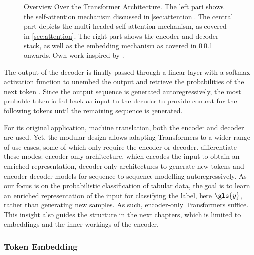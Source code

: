 \begin{landscape}
    \begin{figure}[ht]
        \centering
        {\renewcommand\normalsize{\scriptsize}%
            \normalsize
            }
        \caption[Overview Over the Transformer Architecture]{Overview Over the Transformer Architecture. The left part shows the self-attention mechanism discussed in \cref{sec:attention}. The central part depicts the multi-headed self-attention mechanism, as covered in \cref{sec:attention}. The right part shows the encoder and decoder stack, as well as the \gls{embedding} mechanism as covered in \cref{sec:token-embeddings} onwards. Own work inspired by \textcite[][3]{tayEfficientTransformersSurvey2022}.}
        \label{fig:transformer-architecture-overview}
    \end{figure}
\end{landscape}
The output of the decoder is finally passed through a linear layer with a softmax activation function to unembed the output and retrieve the probabilities of the next \gls{token} \autocite[][5]{vaswaniAttentionAllYou2017}. Since the output sequence is generated autoregressively, the most probable \gls{token} is fed back as input to the decoder to provide context for the following \glspl{token} until the remaining sequence is generated.

For its original application, machine translation, both the encoder and decoder are used. Yet, the modular design allows adapting Transformers to a wider range of use cases, some of which only require the encoder or decoder. \textcite[][16--17]{raffelExploringLimitsTransfer2020} differentiate these modes: encoder-only architecture, which encodes the input to obtain an enriched representation, decoder-only architectures to generate new \glspl{token} and encoder-decoder models for sequence-to-sequence modelling autoregressively. As our focus is on the probabilistic classification of tabular data, the goal is to learn an enriched representation of the input for classifying the label, here $\gls{y}$, rather than generating new samples. As such, encoder-only Transformers suffice. This insight also guides the structure in the next chapters, which is limited to \glspl{embedding} and the inner workings of the encoder.

\subsubsection{Token Embedding}\label{sec:token-embeddings}


